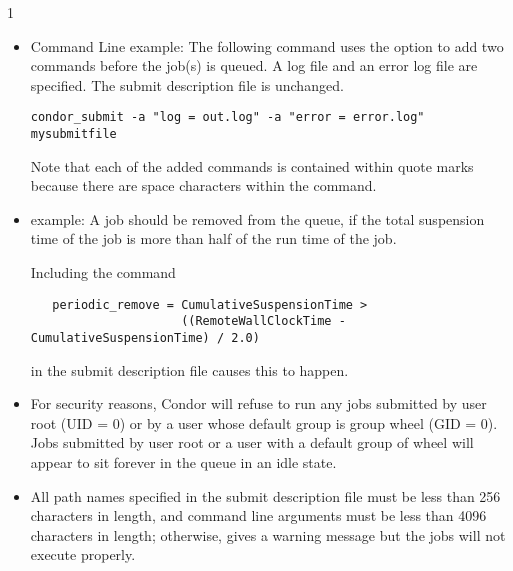 \begin{ManPage}{\label{man-condor-submit}}{1}
\begin{itemize}
\begin{verbatim}
      Error   = err.$(Process)                                                
      Input   = in.$(Process)                                                 
      Output  = out.$(Process)                                                
      Log = foo.log                                                                       
                                                                          
      Queue
\end{verbatim}
\normalsize



\item{Command Line example:} The following command uses the
 option to add two commands before the job(s) is queued.
A log file and an error log file are specified.
The submit description file is unchanged.
\footnotesize
\begin{verbatim}
condor_submit -a "log = out.log" -a "error = error.log" mysubmitfile
\end{verbatim}
\normalsize
Note that each of the added commands is contained within quote marks
because there are space characters within the command.

\item{ example:}
A job should be removed from the queue,
if the total suspension time of the job
is more than half of the run time of the job.

Including the command
\footnotesize
\begin{verbatim}
   periodic_remove = CumulativeSuspensionTime > 
                     ((RemoteWallClockTime - CumulativeSuspensionTime) / 2.0)
\end{verbatim}
\normalsize
in the submit description file causes this to happen.

\end{itemize} 


\GenRem
\begin{itemize}

\item For security reasons, Condor will refuse to run any jobs submitted
by user root (UID = 0) or by a user whose default group is group wheel
(GID = 0). Jobs submitted by user root or a user with a default group of
wheel will appear to sit forever in the queue in an idle state. 

\item All path names specified in the submit description file must be
less than 256 characters in length, and command line arguments must be
less than 4096 characters in length; otherwise,  gives a
warning message but the jobs will not execute properly. 


\end{itemize}
\end{ManPage}
